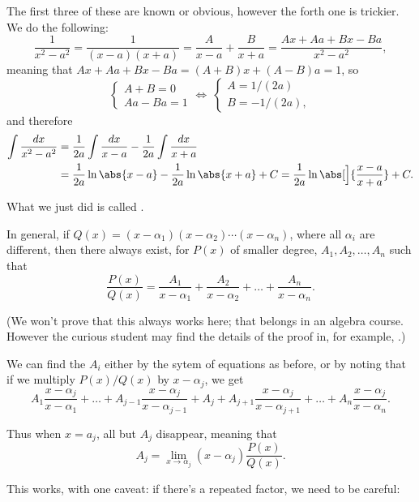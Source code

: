 \noindent
The first three of these are known or obvious, however the forth one is trickier.
We do the following:
\[
	\frac{1}{x^2 - a^2} = \frac{1}{(x - a)(x + a)} = \frac{A}{x - a} + \frac{B}{x + a} = \frac{A x + A a + B x - B a}{x^2 - a^2},
\]
meaning that $A x + A a + B x - B a = (A + B) x + (A - B) a = 1$, so
\[
	\begin{cases}
		A + B = 0 \\
		A a - B a = 1
	\end{cases} \Longleftrightarrow~
	\begin{cases}
		A = 1 / (2 a) \\
		B = - 1 / (2 a),
	\end{cases}
\]
and therefore
\begin{align*}
	\int \frac{d x}{x^2 - a^2} &= \frac{1}{2 a} \int \frac{d x}{x - a} - \frac{1}{2 a} \int \frac{d x}{x + a} \\
	                           &= \frac{1}{2 a} \ln\abs{x - a} - \frac{1}{2 a} \ln\abs{x + a} + C = \frac{1}{2 a} \ln\abs[\Big]{\frac{x - a}{x + a}} + C.
\end{align*}

\noindent
What we just did is called .

In general, if $Q(x) = (x - \alpha_1)(x - \alpha_2) \cdots (x - \alpha_n)$, where all $\alpha_i$ are different, then there always exist, for $P(x)$ of smaller degree, $A_1, A_2, \ldots, A_n$ such that
\[
	\frac{P(x)}{Q(x)} = \frac{A_1}{x - \alpha_1} + \frac{A_2}{x - \alpha_2} + \ldots + \frac{A_n}{x - \alpha_n}.
\]

\noindent
(We won't prove that this always works here; that belongs in an algebra course. However the curious student may find the details of the proof in, for example, \cite[Section 4.4]{Nicholson1999}.)

We can find the $A_i$ either by the sytem of equations as before, or by noting that if we multiply $P(x) / Q(x)$ by $x - \alpha_j$, we get
\[
	A_1 \frac{x - \alpha_j}{x - \alpha_1} + \ldots + A_{j - 1} \frac{x - \alpha_j}{x - \alpha_{j - 1}} + A_j + A_{j + 1} \frac{x - \alpha_j}{x - \alpha_{j + 1}} + \ldots + A_n \frac{x - \alpha_j}{x - \alpha_n}.
\]

\noindent
Thus when $x = a_j$, all but $A_j$ disappear, meaning that
\[
	A_j = \lim_{x \to \alpha_j} (x - \alpha_j) \frac{P(x)}{Q(x)}.
\]

\noindent
This works, with one caveat: if there's a repeated factor, we need to be careful:

